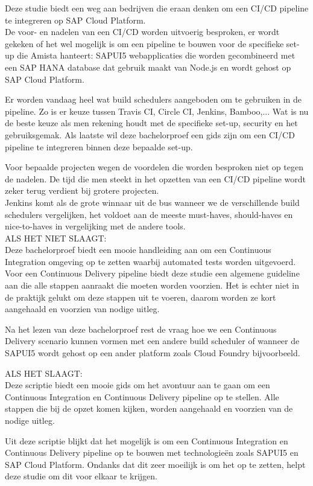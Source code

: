 Deze studie biedt een weg aan bedrijven die eraan denken om een CI/CD pipeline te integreren op SAP Cloud Platform. \\
De voor- en nadelen van een CI/CD worden uitvoerig besproken, er wordt gekeken of het wel mogelijk is om een pipeline te bouwen voor de specifieke set-up die Amista hanteert: SAPUI5 webapplicaties die worden gecombineerd met een SAP HANA database dat gebruik maakt van Node.js en wordt gehost op SAP Cloud Platform.

Er worden vandaag heel wat build schedulers aangeboden om te gebruiken in de pipeline. Zo is er keuze tussen Travis CI, Circle CI, Jenkins, Bamboo,... Wat is nu de beste keuze als men rekening houdt met de specifieke set-up, security en het gebruiksgemak.
Als laatste wil deze bachelorproef een gids zijn om een CI/CD pipeline te integreren binnen deze bepaalde set-up.

Voor bepaalde projecten wegen de voordelen die worden besproken niet op tegen de nadelen. De tijd die men steekt in het opzetten van een CI/CD pipeline wordt zeker terug verdient bij grotere projecten.\\
Jenkins komt als de grote winnaar uit de bus wanneer we de verschillende build schedulers vergelijken, het voldoet aan de meeste must-haves, should-haves en nice-to-haves in vergelijking met de andere tools.\\
ALS HET NIET SLAAGT:\\
Deze bachelorproef biedt een mooie handleiding aan om een Continuous Integration omgeving op te zetten waarbij automated tests worden uitgevoerd.
Voor een Continuous Delivery pipeline biedt deze studie een algemene guideline aan die alle stappen aanraakt die moeten worden voorzien. Het is echter niet in de praktijk gelukt om deze stappen uit te voeren, daarom worden ze kort aangehaald en voorzien van nodige uitleg.

Na het lezen van deze bachelorproef rest de vraag hoe we een Continuous Delivery scenario kunnen vormen met een andere build scheduler of wanneer de SAPUI5 wordt gehost op een ander platform zoals Cloud Foundry bijvoorbeeld.

ALS HET SLAAGT:\\
Deze scriptie biedt een mooie gids om het avontuur aan te gaan om een Continuous Integration en Continuous Delivery pipeline op te stellen. Alle stappen die bij de opzet komen kijken, worden aangehaald en voorzien van de nodige uitleg.

Uit deze scriptie blijkt dat het mogelijk is om een Continuous Integration en Continuous Delivery pipeline op te bouwen met technologieën zoals SAPUI5 en SAP Cloud Platform. Ondanks dat dit zeer moeilijk is om het op te zetten, helpt deze studie om dit voor elkaar te krijgen.
